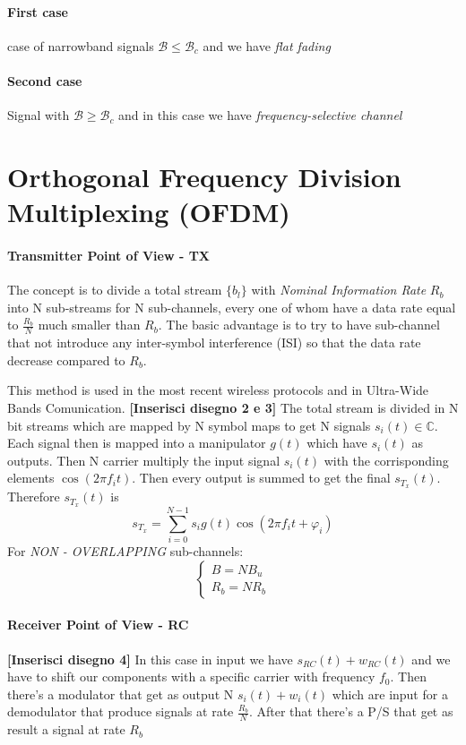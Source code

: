 \paragraph{First case} case of narrowband signals $\mathcal{B} \leq \mathcal{B}_c$ and we have \textit{flat fading}
\paragraph{Second case} Signal with $\mathcal{B} \geq \mathcal{B}_c$
and in this case we have \textit{frequency-selective channel}

\section{Orthogonal Frequency Division Multiplexing (OFDM)}
\paragraph{Transmitter Point of View - TX}
The concept is to divide a total stream $\{b_l\}$ with \textit{Nominal Information Rate} $R_b$ into N sub-streams for N sub-channels, every one of whom have a data rate equal to $\frac{R_b}{N}$ much smaller than $R_b$.
The basic advantage is to try to have sub-channel that not introduce any inter-symbol interference (ISI) so that the data rate decrease compared to $R_b$.

This method is used in the most recent wireless protocols and in Ultra-Wide Bands Comunication.
\textbf{[Inserisci disegno 2 e 3]}
The total stream is divided in N bit streams which are mapped by N symbol maps to get N signals $s_i(t) \in \mathbb{C}$. Each signal then is mapped into a manipulator $g(t)$ which have $s_i(t)$ as outputs. Then N carrier multiply the input signal $s_i(t)$ with the corrisponding elements $\cos(2\pi f_i t)$. Then every output is summed to get the final $s_{T_x}(t)$.
Therefore $s_{T_x}(t)$ is
\begin{equation}
s_{T_x} = \sum\limits_{i=0}^{N-1} s_i g(t) \cos(2\pi f_i t + \varphi_i)
\end{equation}
For \emph{NON - OVERLAPPING} sub-channels:
\begin{equation}
\begin{cases}
B = N B_u\\
R_b = N R_b
\end{cases}
\end{equation}

\paragraph{Receiver Point of View - RC}
\textbf{[Inserisci disegno 4]}
In this case in input we have $s_{RC}(t) + w_{RC}(t)$ and we have to shift our components with a specific carrier with frequency $f_0$. Then there's a modulator that get as output N $s_i(t) + w_i(t)$ which are input for a demodulator that produce signals at rate $\frac{R_b}{N}$. After that there's a P/S that get as result a signal at rate $R_b$

